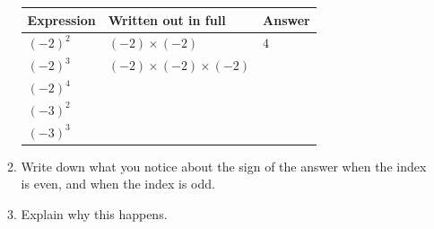 \documentclass[12pt,a4paper]{article}
\newcommand{\ansline}[1][2.2cm]{\underline{\hspace{#1}}}
\begin{document}
\begin{enumerate}[resume]
\begin{enumerate}
\vspace{2pt}
\begin{center}
\renewcommand{\arraystretch}{1.8}
\begin{tabular}{|>{\centering\arraybackslash}p{2.4cm}|>{\centering\arraybackslash}p{6.4cm}|>{\centering\arraybackslash}p{2.4cm}|}
\hline
\textbf{Expression} & \textbf{Written out in full} & \textbf{Answer}\\
\hline
$(-2)^2$ & $(-2)\times(-2)$ & $4$\\ \hline
$(-2)^3$ & $(-2)\times(-2)\times(-2)$ & \\ \hline
$(-2)^4$ & & \\ \hline
$(-3)^2$ & & \\ \hline
$(-3)^3$ & & \\ \hline
\end{tabular}
\end{center}

  \item Write down what you notice about the sign of the answer when the index
        is even, and when the index is odd.

\vspace{6pt}
\ansline[16cm]

\vspace{16pt}
  \item Explain why this happens.

\vspace{6pt}
\ansline[16cm]
\end{enumerate}

\end{enumerate}
\end{document}
